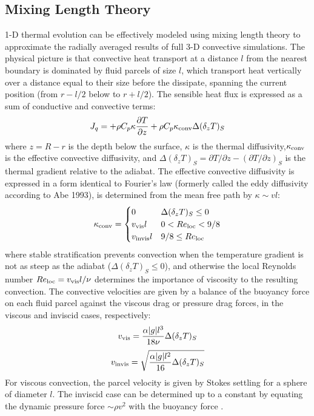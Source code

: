 \subsection{Mixing Length Theory}
1-D thermal evolution can be effectively modeled using mixing length theory to approximate the radially averaged results of full 3-D convective simulations.
The physical picture is that convective heat transport at a distance $l$ from the nearest boundary is dominated by fluid parcels of size $l$, which transport heat vertically over a distance equal to their size before the dissipate, spanning the current position (from $r-l/2$ below to $r+l/2$).
The sensible heat flux is expressed as a sum of conductive and convective terms:
\begin{equation}
  J_q = +\rho C_p \kappa \frac{\partial T}{\partial z} + \rho C_p \kappa_{\rm conv}\Delta(\delta_z T)_S
\end{equation}
where $z=R-r$ is the depth below the surface, $\kappa$ is the thermal diffusivity,$\kappa_{\rm conv}$ is the effective convective diffusivity, and $\Delta(\delta_z T)_S = \partial T/\partial z - (\partial T/\partial z)_S$ is the thermal gradient relative to the adiabat.
The effective convective diffusivity is expressed in a form identical to Fourier's law (formerly called the eddy diffusivity according to Abe 1993), is determined from the mean free path by $\kappa \sim v l$:
\begin{equation}
  \kappa_{\rm conv} = \begin{cases}
  0 & \Delta(\delta_z T)_S \leq 0 \\
  v_{\rm vis}l & 0 < {Re}_{\rm loc} < 9/8 \\
  v_{\rm invis}l &  9/8 \leq { Re}_{\rm loc}
\end{cases}
\label{eq:convdiff}
\end{equation}
where stable stratification prevents convection when the temperature gradient is not as steep as the adiabat ($\Delta(\delta_z T)_S \leq 0$), and otherwise the local Reynolds number $Re_{\rm loc} = v_{\rm vis} l / \nu$ determines the importance of viscosity to the resulting convection.
The convective velocities are given by a balance of the buoyancy force on each fluid parcel against the viscous drag or pressure drag forces, in the viscous and inviscid cases, respectively:
\begin{equation}
  v_{\rm vis} = \frac{\alpha |g| l^3}{18\nu}  \Delta(\delta_z T)_S \\
\end{equation}
\begin{equation}
  v_{\rm invis} = \sqrt{\frac{\alpha |g| l^2}{16}  \Delta(\delta_z T)_S} \\
\end{equation}
For viscous convection, the parcel velocity is given by Stokes settling for a sphere of diameter $l$. The inviscid case can be determined up to a constant by equating the dynamic pressure force $\sim$$\rho v^2$ with the buoyancy force .


